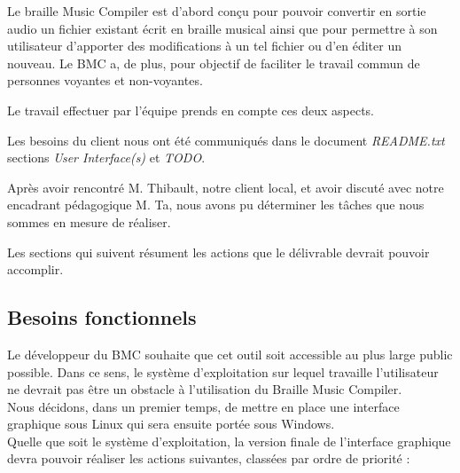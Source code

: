 
Le braille Music Compiler est d'abord conçu pour pouvoir convertir en sortie audio un fichier existant écrit en braille musical ainsi que pour permettre à son utilisateur d'apporter des modifications à un tel fichier ou d'en éditer un nouveau. Le BMC a, de plus, pour objectif de faciliter le travail commun de personnes voyantes et non-voyantes.

Le travail effectuer par l'équipe prends en compte ces deux aspects.

Les besoins du client nous ont été communiqués dans le document \textit{README.txt} sections \textit{User Interface(s)} et \textit{TODO}.

Après avoir rencontré M. Thibault, notre client local, et avoir discuté avec notre encadrant pédagogique M. Ta, nous avons pu déterminer les tâches que nous sommes en mesure de réaliser. 

Les sections qui suivent résument les actions que le délivrable devrait pouvoir accomplir.


\subsection{Besoins fonctionnels}
Le développeur du BMC souhaite que cet outil soit accessible au plus large public possible. Dans ce sens, le système d'exploitation sur lequel travaille l'utilisateur ne devrait pas être un obstacle à l'utilisation du Braille Music Compiler.\\

Nous décidons, dans un premier temps, de mettre en place une interface graphique sous Linux qui sera ensuite portée sous Windows.\\
 
Quelle que soit le système d'exploitation, la version finale de l'interface graphique devra pouvoir réaliser les actions suivantes, classées par ordre de priorité : \\

